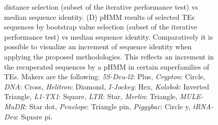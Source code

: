 \documentclass[unnumsec,webpdf,contemporary,large]{oup-authoring-template}%
\theoremstyle{thmstyleone}%
\theoremstyle{thmstyletwo}%
\theoremstyle{thmstylethree}%
\begin{document}
\begin{figure}[hbt!]
{distance selection (subset of the iterative performance test) vs median sequence
identity. (D) pHMM results of selected TEs sequences by bootstrap value selection
(subset of the iterative performance test) vs median sequence identity.
Comparatively it is possible to visualize an increment of sequence identity when
applying the proposed methodologies. This reflects an increment in the recuperated sequences by a pHMM in certain superfamilies of
TEs. Makers are the following: \textit{5S{-}Deu{-}l2}: Plus, \textit{Crypton}: Circle, \textit{DNA}\@:
Cross, \textit{Helitron}: Diamond, \textit{I{-}Jockey}: Hex, \textit{Kolobok}: Inverted Triangle, \textit{L1{-}TX1}:
Square, \textit{LTR}\@: Star, \textit{Merlin}: Triangle, \textit{MULE{-}MuDR}\@: Star dot, \textit{Penelope}: Triangle pin, 
\textit{Piggybac}: Circle y, \textit{tRNA{-}Deu}: Square pi.}\label{fig:image4}
\end{figure}
    
\end{document}
